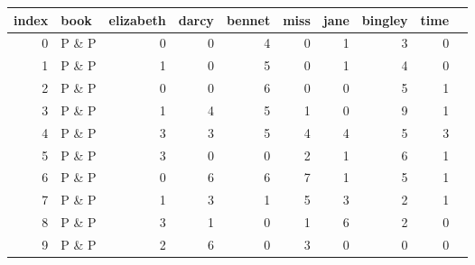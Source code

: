 \begin{tabular}{rlrrrrrrrr}
  \hline
index & book & elizabeth & darcy & bennet & miss & jane & bingley & time \\ 
  \hline
  0 & P \& P &   0 &   0 &   4 &   0 &   1 &   3 &   0 \\ 
    1 & P \& P &   1 &   0 &   5 &   0 &   1 &   4 &   0 \\ 
    2 & P \& P &   0 &   0 &   6 &   0 &   0 &   5 &   1 \\ 
    3 & P \& P &   1 &   4 &   5 &   1 &   0 &   9 &   1 \\ 
    4 & P \& P &   3 &   3 &   5 &   4 &   4 &   5 &   3 \\ 
    5 & P \& P &   3 &   0 &   0 &   2 &   1 &   6 &   1 \\ 
    6 & P \& P &   0 &   6 &   6 &   7 &   1 &   5 &   1 \\ 
    7 & P \& P &   1 &   3 &   1 &   5 &   3 &   2 &   1 \\ 
    8 & P \& P &   3 &   1 &   0 &   1 &   6 &   2 &   0 \\ 
    9 & P \& P &   2 &   6 &   0 &   3 &   0 &   0 &   0 \\ 
   \hline
\end{tabular}
